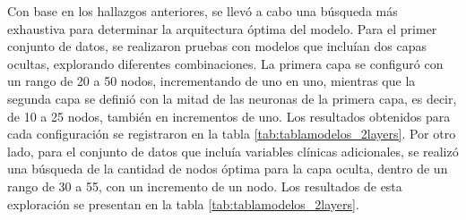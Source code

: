 Con base en los hallazgos anteriores, se llevó a cabo una búsqueda más exhaustiva para determinar la 
arquitectura óptima del modelo. Para el primer conjunto de datos, se realizaron pruebas con modelos 
que incluían dos capas ocultas, explorando diferentes combinaciones. La primera capa se configuró 
con un rango de 20 a 50 nodos, incrementando de uno en uno, mientras que la segunda capa se definió 
con la mitad de las neuronas de la primera capa, es decir, de 10 a 25 nodos, también en incrementos 
de uno. Los resultados obtenidos para cada configuración se registraron en la tabla \ref{tab:tablamodelos_2layers}. 
Por otro lado, para el conjunto de datos que incluía variables clínicas adicionales, se realizó una 
búsqueda de la cantidad de nodos óptima para la capa oculta, dentro de un rango de 30 a 55, con un 
incremento de un nodo. Los resultados de esta exploración se presentan en la tabla \ref{tab:tablamodelos_2layers}.

